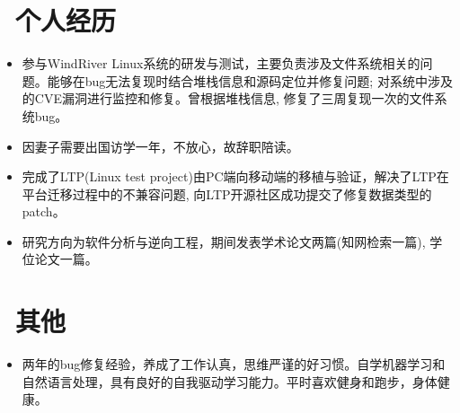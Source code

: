 \documentclass[10pt]{resume}
\begin{document}

  \section{\faUsers\ 个人经历}
\begin{itemize}\normalsize
\item {参与WindRiver Linux系统的研发与测试，主要负责涉及文件系统相关的问题。能够在bug无法复现时结合堆栈信息和源码定位并修复问题; 对系统中涉及的CVE漏洞进行监控和修复。曾根据堆栈信息, 修复了三周复现一次的文件系统bug。}
 \item {因妻子需要出国访学一年，不放心，故辞职陪读。}
\end{itemize}
\begin{itemize}\normalsize
\item {完成了LTP(Linux test project)由PC端向移动端的移植与验证，解决了LTP在平台迁移过程中的不兼容问题, 向LTP开源社区成功提交了修复数据类型的patch。}
\end{itemize}
\begin{itemize}\normalsize
\item {研究方向为软件分析与逆向工程，期间发表学术论文两篇(知网检索一篇), 学位论文一篇。}
\end{itemize}

\section{\faInfo\ 其他}
\begin{itemize}[parsep=0.5ex]\normalsize
  \item {两年的bug修复经验，养成了工作认真，思维严谨的好习惯。自学机器学习和自然语言处理，具有良好的自我驱动学习能力。平时喜欢健身和跑步，身体健康。}
\end{itemize}
\end{document}
